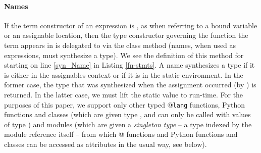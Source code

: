 \paragraph{Names} If the term constructor of an expression is , as when referring to a bound variable or an assignable location, then the type constructor governing the function the term appears in is delegated to via the class method  (names, when used as expressions, must synthesize a type). We see the definition of this method for  starting on line \ref{syn_Name} in Listing \ref{fn-stmts}. A name synthesizes a type if it is either in the assignables context or if it is in the static environment. In the former case, the type that was synthesized when the assignment occurred (by ) is returned. In the latter case, we must lift the static value to run-time. For the purposes of this paper, we support only other typed @\texttt{lang} functions, Python functions and classes (which are given type , and can only be called with values of type ) and modules (which are given a \emph{singleton type} -- a type indexed by the module reference itself -- from which @ functions and Python functions and classes can be accessed as attributes in the usual way, see below).%
